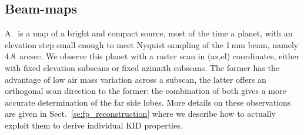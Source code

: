 \subsection{Beam-maps}

A \bm\ is a map of a bright and compact source, most of the time
a planet, with an elevation step small enough to meet Nyquist sampling of the
1\,mm beam, namely 4.8~arcsec. We observe this planet with a raster scan in
(az,el) coordinates, either with fixed elevation subscans or fixed azimuth
subscans. The former has the advantage of low air mass variation across a
subscan, the latter offers an orthogonal scan direction to the former: the
combination of both gives a more accurate determination of the far side
lobes. More details on these observations are given in
Sect.~\ref{se:fp_reconstruction} where we describe how to actually exploit them
to derive individual KID properties.


